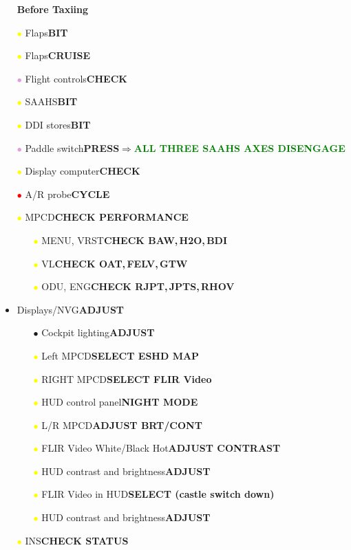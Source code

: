 \documentclass[a4paper,12pt,dvipsnames]{letter}
\newcommand{\radio}[1]{\textcolor{blue}{#1}}
\newcommand{\button}[1]{\textbf{#1}}
\newcommand{\ok}[1]{\textcolor{Green}{\textbf{#1}}}
\newcommand{\bi}{\textcolor{ProcessBlue}{$\bullet$\;}}
\newcommand{\ri}{\textcolor{red}{$\bullet$\;}}
\newcommand{\yi}{\textcolor{Yellow}{$\bullet$\;}}
\newcommand{\vi}{\textcolor{Plum}{$\bullet$\;}}
\begin{document}
{\newpage
\begin{itemize}
\item[] {\LARGE\textbf{Before Taxiing}}
\item[\yi] Flaps\dotfill\button{BIT}
\item[\yi] Flaps\dotfill\button{CRUISE}
\item[\vi] Flight controls\dotfill\button{CHECK}
\item[\yi] SAAHS\dotfill\button{BIT}
\item[\yi] DDI stores\dotfill\button{BIT}
\item[\vi] Paddle switch\dotfill\button{PRESS}\;$\Rightarrow$\;\ok{ALL THREE SAAHS AXES DISENGAGE}
\item[\yi] Display computer\dotfill\button{CHECK}
\item[\ri] A/R probe\dotfill\button{CYCLE}
\item[\yi] MPCD\dotfill\button{CHECK PERFORMANCE}
\begin{itemize}
 \item[\yi] MENU, VRST\dotfill\button{CHECK BAW,\,H2O,\,BDI}
 \item[\yi] VL\dotfill\button{CHECK OAT,\,FELV,\,GTW}
 \item[\yi] ODU, ENG\dotfill\button{CHECK RJPT,\,JPTS,\,RHOV}
\end{itemize}
\item Displays/NVG\dotfill\button{ADJUST}
\begin{itemize}
 \item[\bi] Cockpit lighting\dotfill\button{ADJUST}
 \item[\yi] Left MPCD\dotfill\button{SELECT ESHD MAP}
 \item[\yi] RIGHT MPCD\dotfill\button{SELECT FLIR Video}
 \item[\yi] HUD control panel\dotfill\button{NIGHT MODE}
 \item[\yi] L/R MPCD\dotfill\button{ADJUST BRT/CONT}
 \item[\yi] FLIR Video White/Black Hot\dotfill\button{ADJUST CONTRAST}
 \item[\yi] HUD contrast and brightness\dotfill\button{ADJUST}
 \item[\yi] FLIR Video in HUD\dotfill\button{SELECT (castle switch down)}
 \item[\yi] HUD contrast and brightness\dotfill\button{ADJUST}
\end{itemize}
\item[\yi] INS\dotfill\button{CHECK STATUS}

\end{itemize}}
\end{document}
